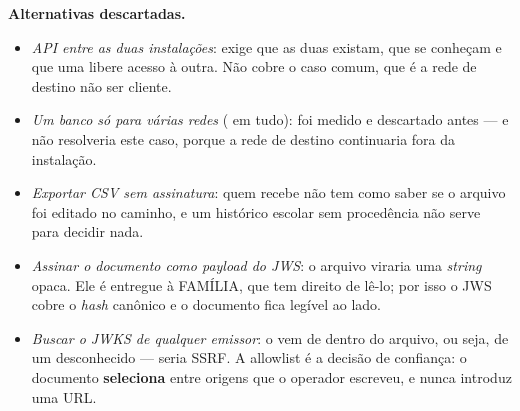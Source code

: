 \textbf{Alternativas descartadas.}
\begin{itemize}
  \item \emph{API entre as duas instalações}: exige que as duas existam, que se
    conheçam e que uma libere acesso à outra. Não cobre o caso comum, que é a
    rede de destino não ser cliente.
  \item \emph{Um banco só para várias redes} ( em tudo): foi medido
    e descartado antes --- e não resolveria este caso, porque a rede de destino
    continuaria fora da instalação.
  \item \emph{Exportar CSV sem assinatura}: quem recebe não tem como saber se o
    arquivo foi editado no caminho, e um histórico escolar sem procedência não
    serve para decidir nada.
  \item \emph{Assinar o documento como \emph{payload} do JWS}: o arquivo viraria
    uma \emph{string} opaca. Ele é entregue à FAMÍLIA, que tem direito de lê-lo;
    por isso o JWS cobre o \emph{hash} canônico e o documento fica legível ao
    lado.
  \item \emph{Buscar o JWKS de qualquer emissor}: o  vem de
    dentro do arquivo, ou seja, de um desconhecido --- seria SSRF. A allowlist
     é a decisão de confiança: o documento
    \textbf{seleciona} entre origens que o operador escreveu, e nunca introduz
    uma URL.
\end{itemize}

